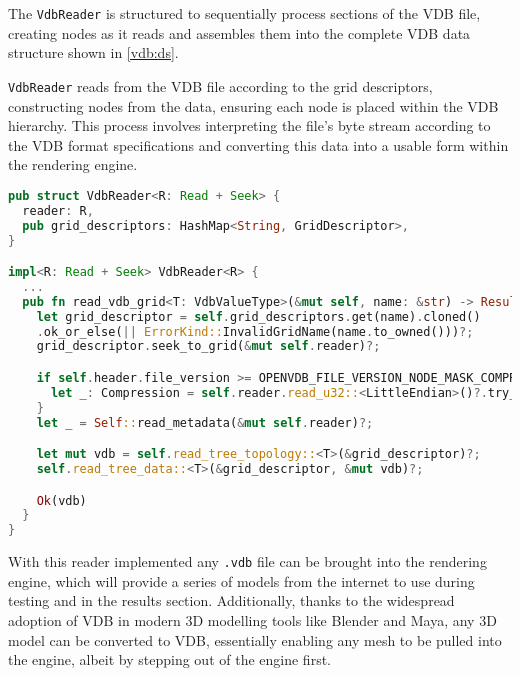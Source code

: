 The \texttt{VdbReader} is structured to sequentially process sections of the VDB file, creating nodes as it reads and assembles them into the complete VDB data structure shown in \cref{vdb:ds}.

\texttt{VdbReader} reads from the VDB file according to the grid descriptors, constructing nodes from the data, ensuring each node is placed within the VDB hierarchy. This process involves interpreting the file's byte stream according to the VDB format specifications and converting this data into a usable form within the rendering engine.

\begin{lstlisting}[language=rust, captionpos=b, caption={
    \texttt{VdbReader} definition: \texttt{reader} is file stream handler, \texttt{grid\_descriptors} hold the metadata given in \cref{file:meta}.
    \texttt{VdbReader} implementation: The method \texttt{read\_vdb\_grid} is shown, which is called after the file header is handled, and returns a VDB if the file contents match the expectations from the header; if not, it returns an error.
  }, label={vdb:read}]
pub struct VdbReader<R: Read + Seek> {
  reader: R,
  pub grid_descriptors: HashMap<String, GridDescriptor>,
}

impl<R: Read + Seek> VdbReader<R> {
  ...
  pub fn read_vdb_grid<T: VdbValueType>(&mut self, name: &str) -> Result<VDB<T>> {
    let grid_descriptor = self.grid_descriptors.get(name).cloned()
    .ok_or_else(|| ErrorKind::InvalidGridName(name.to_owned()))?;
    grid_descriptor.seek_to_grid(&mut self.reader)?;

    if self.header.file_version >= OPENVDB_FILE_VERSION_NODE_MASK_COMPRESSION {
      let _: Compression = self.reader.read_u32::<LittleEndian>()?.try_into()?;
    }
    let _ = Self::read_metadata(&mut self.reader)?;

    let mut vdb = self.read_tree_topology::<T>(&grid_descriptor)?;
    self.read_tree_data::<T>(&grid_descriptor, &mut vdb)?;

    Ok(vdb)
  }
}
\end{lstlisting}

With this reader implemented any \texttt{.vdb} file can be brought into the rendering engine, which will provide a series of models from the internet to use during testing and in the results section. Additionally, thanks to the widespread adoption of VDB in modern 3D modelling tools like Blender and Maya, any 3D model can be converted to VDB, essentially enabling any mesh to be pulled into the engine, albeit by stepping out of the engine first.

